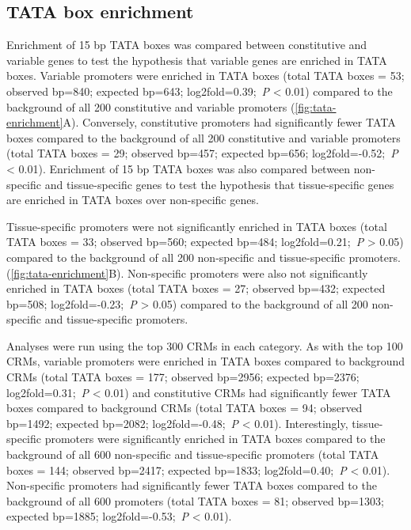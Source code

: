 \documentclass[../main.tex]{subfiles}
\begin{document}
\subsection{TATA box enrichment}

Enrichment of 15 bp TATA boxes was compared between constitutive and
variable genes to test the hypothesis that variable genes are enriched in TATA boxes.
Variable promoters were enriched in TATA boxes (total TATA boxes = 53; observed bp=840; expected bp=643; log2fold=0.39;~\textit{P} \textless{} 0.01) compared to the background of all 200 constitutive and variable promoters
(\autoref{fig:tata-enrichment}A).
Conversely, constitutive promoters had significantly fewer TATA boxes compared to the background of all 200 constitutive and variable promoters (total TATA boxes = 29; observed bp=457; expected bp=656; log2fold=-0.52;~\textit{P} \textless{} 0.01).
Enrichment of 15 bp TATA boxes was also compared between non\hyp{}specific and
tissue\hyp{}specific genes to test the hypothesis that tissue\hyp{}specific genes are enriched in TATA boxes over non\hyp{}specific genes.

Tissue\hyp{}specific promoters were not significantly enriched in TATA boxes (total TATA boxes = 33; observed bp=560; expected bp=484; log2fold=0.21;~\textit{P} \textgreater{} 0.05) compared to the background of all 200 non\hyp{}specific and tissue\hyp{}specific promoters.
(\autoref{fig:tata-enrichment}B).
Non\hyp{}specific promoters were also not significantly enriched in TATA boxes (total TATA boxes = 27; observed bp=432; expected bp=508; log2fold=-0.23;~\textit{P} \textgreater{} 0.05) compared to the background of all 200 non\hyp{}specific and tissue\hyp{}specific promoters.

Analyses were run using the top 300 CRMs in each category.
As with the top 100 CRMs, variable promoters were enriched in TATA boxes compared to background CRMs (total TATA boxes = 177; observed bp=2956; expected bp=2376; log2fold=0.31;~\textit{P} \textless{} 0.01) and constitutive CRMs had significantly fewer TATA boxes compared to background CRMs (total TATA boxes = 94; observed bp=1492; expected bp=2082; log2fold=-0.48;~\textit{P} \textless{} 0.01).
Interestingly, tissue\hyp{}specific promoters were significantly enriched in TATA boxes compared to the background of all 600 non\hyp{}specific and tissue\hyp{}specific promoters (total TATA boxes = 144; observed bp=2417; expected bp=1833; log2fold=0.40;~\textit{P} \textless{} 0.01).
Non\hyp{}specific promoters had significantly fewer TATA boxes compared to the background of all 600 promoters (total TATA boxes = 81; observed bp=1303; expected bp=1885; log2fold=-0.53;~\textit{P} \textless{} 0.01).
\end{document}
